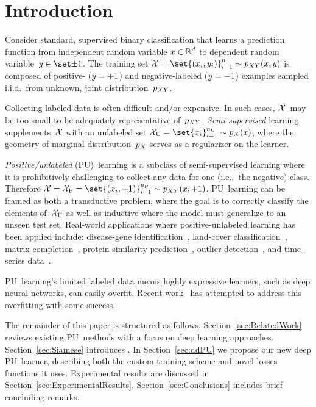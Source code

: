 \section{Introduction}\label{sec:Introduction}

Consider standard, supervised binary classification that learns a prediction function from independent random variable ${x \in \mathbb{R}^{d}}$ to dependent random variable~${\y \in \labels}$. The training set ${\train = \set{(\X_i,\y_i)}_{i=1}^{\size} \sim \joint(\X,\y)}$ is composed of positive- (${y={+}1}$) and negative-labeled (${y={-}1}$) examples sampled i.i.d.\ from unknown, joint distribution~$p_{XY}$.

Collecting labeled data is often difficult and/or expensive.  In such cases, $\mathcal{X}$~may be too small to be adequately representative of~$p_{XY}$.  \textit{Semi-supervised} learning supplements~$\mathcal{X}$ with an unlabeled set ${\unlabel = \set{x_i}_{i=1}^{\size_{\textnormal{U}}} \sim \marginal(\X)}$, where the geometry of marginal distribution~$p_{X}$ serves as a regularizer on the learner.

\textit{Positive\-/unlabeled} (PU)~learning is a subclass of semi-supervised learning where it is prohibitively challenging to collect any data for one (i.e.,~the negative) class.  Therefore ${\train = \pos = \set{(\X_i,\pCls)}_{i=1}^{\size_{\textnormal{P}}} \sim \joint(\X,\pCls)}$.  PU~learning can be framed as both a transductive problem, where the goal is to correctly classify the elements of~$\mathcal{X}_{\textnormal{U}}$ as well as inductive where the model must generalize to an unseen test set. Real-world applications where positive-unlabeled learning has been applied include: disease-gene identification~\cite{Yang:2012}, land-cover classification~\cite{Li:2011}, matrix completion~\cite{Hsieh:2015}, protein similarity prediction~\cite{Elkan:2008}, outlier detection~\cite{Hido:2008,Scott:2009}, and time-series data~\cite{Nguyen:2011}.

PU~learning's limited labeled data means highly expressive learners, such as deep neural networks, can easily overfit.  Recent work~\cite{duPlessis:2014,Kiryo:2017} has attempted to address this overfitting with some success.

The remainder of this paper is structured as follows.  Section~\ref{sec:RelatedWork} reviews existing PU~methods with a focus on deep learning approaches.  Section~\ref{sec:Siamese} introduces .  In Section~\ref{sec:ddPU} we propose our new deep PU~learner, describing both the custom training scheme and novel losses functions it uses.  Experimental results are discussed in Section~\ref{sec:ExperimentalResults}. Section~\ref{sec:Conclusions} includes brief concluding remarks.
